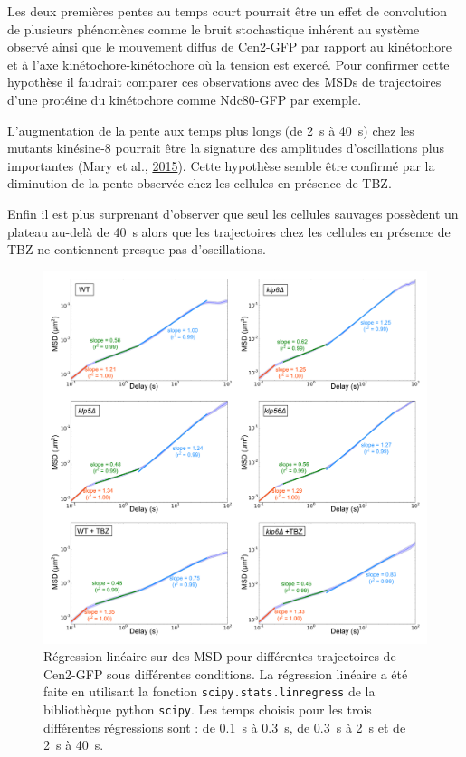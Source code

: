 \documentclass[12pt,a4paper,twoside,openright]{book}
\begin{document}
Les deux premières pentes au temps court pourrait être un effet de
convolution de plusieurs phénomènes comme le bruit stochastique inhérent
au système observé ainsi que le mouvement diffus de Cen2-GFP par rapport
au kinétochore et à l'axe kinétochore-kinétochore où la tension est
exercé. Pour confirmer cette hypothèse il faudrait comparer ces
observations avec des MSDs de trajectoires d'une protéine du kinétochore
comme Ndc80-GFP par exemple.

L'augmentation de la pente aux temps plus longs (de 2~s à 40~s) chez les
mutants kinésine-8 pourrait être la signature des amplitudes
d'oscillations plus importantes (Mary et al.,
\protect\hyperlink{ref-Mary2015}{2015}). Cette hypothèse semble être
confirmé par la diminution de la pente observée chez les cellules en
présence de TBZ.

Enfin il est plus surprenant d'observer que seul les cellules sauvages
possèdent un plateau au-delà de 40~s alors que les trajectoires chez les
cellules en présence de TBZ ne contiennent presque pas d'oscillations.

\begin{figure}[htbp]
\centering
\includegraphics{figures/results/imaging/msds_log_fit.png}
\caption[Régression linéaire sur des MSD pour différentes trajectoires de Cen2-GFP sous différentes conditions]{\label{fig:msds-log-fit}Régression
linéaire sur des MSD pour différentes trajectoires de Cen2-GFP sous
différentes conditions. La régression linéaire a été faite en utilisant
la fonction \texttt{scipy.stats.linregress} de la bibliothèque python
\texttt{scipy}. Les temps choisis pour les trois différentes régressions
sont : de 0.1~s à 0.3~s, de 0.3~s à 2~s et de 2~s à 40~s.}
\end{figure}
\end{document}
